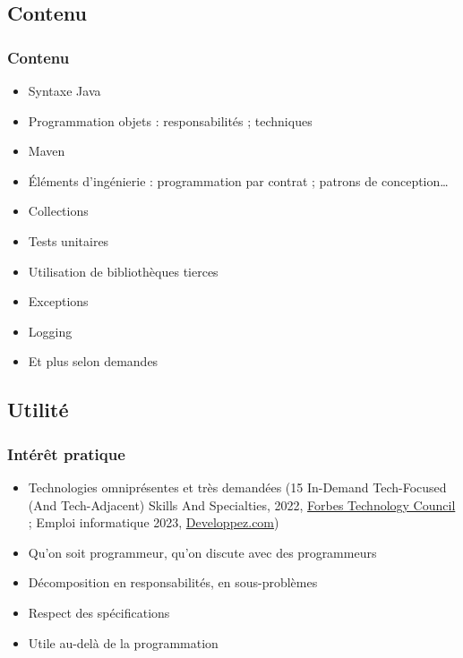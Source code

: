 \documentclass[english, french]{beamer}
\begin{document}
\subsection{Contenu}
\begin{frame}
	\frametitle{Contenu}
	\begin{itemize}
		\item Syntaxe Java
		\item Programmation objets : responsabilités ; techniques
		\item Maven
		\item Éléments d’ingénierie : programmation par contrat ; patrons de conception…
		\item Collections
		\item Tests unitaires
		\item Utilisation de bibliothèques tierces
		\item Exceptions
		\item Logging
		\item Et plus selon demandes
	\end{itemize}
\end{frame}

\subsection{Utilité}
\begin{frame}
	\frametitle{Intérêt pratique}
	\begin{itemize}
		\item Technologies omniprésentes et très demandées {\tiny (15 In-Demand Tech-Focused (And Tech-Adjacent) Skills And Specialties, 2022, \href{https://www.forbes.com/sites/forbestechcouncil/2022/07/11/15-in-demand-tech-focused-and-tech-adjacent-skills-and-specialties/?sh=44e82adc38d8}{Forbes Technology Council} ; Emploi informatique 2023, \href{https://emploi.developpez.com/actu/356753/}{Developpez.com})}
		\item Qu’on soit programmeur, qu’on discute avec des programmeurs
		\item Décomposition en responsabilités, en sous-problèmes
		\item Respect des spécifications
		\item Utile au-delà de la programmation
	\end{itemize}
\end{frame}
\end{document}
